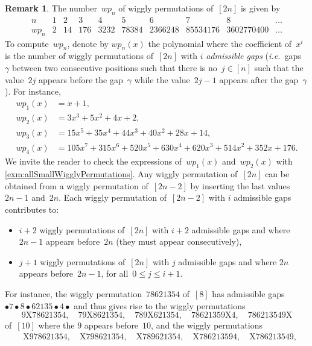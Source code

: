 \documentclass{amsart}
\theoremstyle{definition}
\newtheorem{remark}[theorem]{Remark}
\newcommand{\ie}{\textit{i.e.}~} %
\newcommand{\darkblue}{\color{darkblue}} %
\newcommand{\defn}[1]{\textsl{\darkblue #1}} %
\begin{document}
\begin{remark}
\label{rem:numberWigglyPermutations}
The number~$wp_n$ of wiggly permutations of~$[2n]$ is given by
\[
\begin{array}{c|ccccccccc}
n & 1 & 2 & 3 & 4 & 5 & 6 & 7 & 8 & \dots \\
\hline
wp_n & 2 & 14 & 176 & 3232 & 78384 & 2366248 & 85534176 & 3602770400 & \dots
\end{array}
\]
To compute~$wp_n$, denote by $wp_n(x)$ the polynomial where the coefficient of~$x^i$ is the number of wiggly permutations of~$[2n]$ with $i$ \defn{admissible gaps} (\ie gaps~$\gamma$ between two consecutive positions such that there is no~$j \in [n]$ such that the value~$2j$ appears before the gap~$\gamma$ while the value~$2j-1$ appears after the gap~$\gamma$).
For instance,
\begin{align*}
	wp_1(x) & = x + 1, \\
	wp_2(x) & = 3 x^3 + 5 x^2 + 4 x + 2, \\
	wp_3(x) & = 15 x^5 + 35 x^4 + 44 x^3 + 40 x^2 + 28 x + 14, \\
	wp_4(x) & = 105 x^7 + 315 x^6 + 520 x^5 + 630 x^4 + 620 x^3 + 514 x^2 + 352 x + 176.
\end{align*}
We invite the reader to check the expressions of~$wp_1(x)$ and~$wp_2(x)$ with \cref{exm:allSmallWigglyPermutations}.
Any wiggly permutation of~$[2n]$ can be obtained from a wiggly permutation of~$[2n-2]$ by inserting the last values~$2n-1$ and~$2n$.
Each wiggly permutation of~$[2n-2]$ with $i$ admissible gaps contributes to:
\begin{itemize}
\item $i+2$ wiggly permutations of~$[2n]$ with $i+2$ admissible gaps and where~$2n-1$ appears before~$2n$ (they must appear consecutively),
\item $j+1$ wiggly permutations of~$[2n]$ with $j$ admissible gaps and where $2n$ appears before~$2n-1$, for all~$0 \le j \le i+1$.
\end{itemize}
For instance, the wiggly permutation~$78621354$ of~$[8]$ has admissible gaps~$\bullet 7 \bullet 8 \bullet 62135 \bullet 4 \bullet$ and thus gives rise to the wiggly permutations
\[
9\mathrm{X}78621354, \quad 79\mathrm{X}8621354, \quad 789\mathrm{X}621354, \quad 78621359\mathrm{X}4, \quad 786213549\mathrm{X}
\]
of~$[10]$ where the $9$ appears before~$10$, and the wiggly permutations
\begin{align*}
& \mathrm{X}978621354, \quad \mathrm{X}798621354, \quad \mathrm{X}789621354, \quad \mathrm{X}786213594, \quad \mathrm{X}786213549, \\

\end{align*}
\end{remark}
\end{document}
